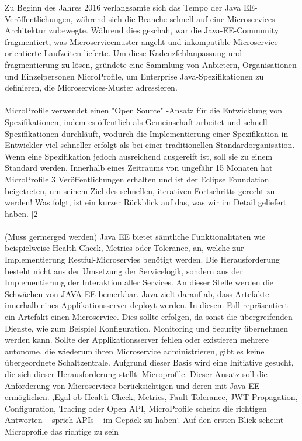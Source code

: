 Zu Beginn des Jahres 2016 verlangsamte sich das Tempo der Java EE-Veröffentlichungen, während sich die Branche schnell auf eine Microservices-Architektur zubewegte. Während dies geschah, war die Java-EE-Community fragmentiert, was Microservicemuster angeht und inkompatible Microservice-orientierte Laufzeiten lieferte. Um diese Kadenzfehlanpassung und -fragmentierung zu lösen, gründete eine Sammlung von Anbietern, Organisationen und Einzelpersonen MicroProfile, um Enterprise Java-Spezifikationen zu definieren, die Microservices-Muster adressieren.\\ \\
MicroProfile verwendet einen "Open Source" -Ansatz für die Entwicklung von Spezifikationen, indem es öffentlich als Gemeinschaft arbeitet und schnell Spezifikationen durchläuft, wodurch die Implementierung einer Spezifikation in Entwickler viel schneller erfolgt als bei einer traditionellen Standardorganisation. Wenn eine Spezifikation jedoch ausreichend ausgereift ist, soll sie zu einem Standard werden.
Innerhalb eines Zeitraums von ungefähr 15 Monaten hat MicroProfile 3 Veröffentlichungen erhalten und ist der Eclipse Foundation beigetreten, um seinem Ziel des schnellen, iterativen Fortschritts gerecht zu werden! Was folgt, ist ein kurzer Rückblick auf das, was wir im Detail geliefert haben. [2] \\ \\


(Muss germerged werden) Java EE bietet sämtliche Funktionalitäten wie beispielweise Health Check, Metrics oder Tolerance, an, welche zur Implementierung Restful-Microservies benötigt werden. Die Herausforderung besteht nicht aus der Umsetzung der Servicelogik, sondern aus der Implementierung der Interaktion aller Services. An dieser Stelle werden die Schwächen von JAVA EE bemerkbar. Java zielt darauf ab, dass Artefakte innerhalb eines Applikationsserver deployt werden. In diesem Fall repräsentiert ein Artefakt einen Microservice. Dies sollte erfolgen, da sonst die übergreifenden Dienste, wie zum Beispiel Konfiguration, Monitoring und Security übernehmen werden kann. Sollte der Applikationsserver fehlen oder existieren mehrere autonome, die wiederum ihren Microservice administrieren, gibt es keine übergeordnete Schaltzentrale. Aufgrund dieser Basis wird eine Initiative gesucht, die sich dieser Herausforderung stellt: Microprofile. Dieser Ansatz soll die Anforderung von Microservices berücksichtigen und deren mit Java EE ermöglichen. ‚Egal ob Health Check, Metrics, Fault Tolerance, JWT Propagation, Configuration, Tracing oder Open API, MicroProfile scheint die richtigen Antworten – sprich APIs – im Gepäck zu haben‘. Auf den ersten Blick scheint Microprofile das richtige zu sein